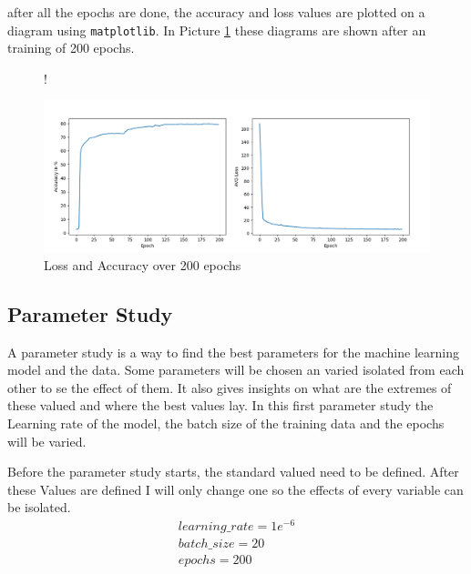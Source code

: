 \documentclass[a4paper, 12pt, oneside]{scrbook}
\begin{document}
				\noindent after all the epochs are done, the accuracy and loss values are plotted on a diagram using \texttt{matplotlib}. In Picture \ref{fig:lossAndAccuracy} these diagrams are shown after an training of 200 epochs.
				
				\begin{figure} [H]
					\centering
					\resizebox{\linewidth} {!} {
						\includegraphics{res/firstEDA/lossAndAccuracy.png}
						
					}
					\caption{Loss and Accuracy over 200 epochs}
					\label{fig:lossAndAccuracy}
				\end{figure}
			
			\subsection{Parameter Study}
			
				\noindent A parameter study is a way to find the best parameters for the machine learning model and the data. Some parameters will be chosen an varied isolated from each other to se the effect of them. It also gives insights on what are the extremes of these valued and where the best values lay. In this first parameter study the Learning rate of the model, the batch size of the training data and the epochs will be varied. 
				
				\noindent Before the parameter study starts, the standard valued need to be defined. After these Values are defined I will only change one so the effects of every variable can be isolated. 
				\begin{gather}
					learning\_rate = 1e^{-6}\\
					batch\_size = 20\\
					epochs = 200
				\end{gather}
				
\end{document}
